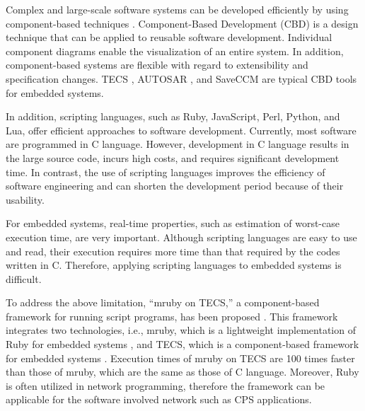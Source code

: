 \documentclass[conference]{IEEEtran/IEEEtran/IEEEtran}
\begin{document}
Complex and large-scale software systems can be developed efficiently by using component-based techniques \cite{par:Crnkovic}.
Component-Based Development (CBD) is a design technique that can be applied to reusable software development.
Individual component diagrams enable the visualization of an entire system.
In addition, component-based systems are flexible with regard to extensibility and specification changes.
TECS \cite{par:TECS}, AUTOSAR \cite{url:AUTOSAR}, and SaveCCM \cite{par:SAVEapproach} are typical CBD tools for embedded systems.

In addition, scripting languages, such as Ruby, JavaScript, Perl, Python, and Lua, offer efficient approaches to software development.
Currently, most software are programmed in C language.
However, development in C language results in the large source code, incurs high costs, and requires significant development time.
In contrast, the use of scripting languages improves the efficiency of software engineering and can shorten the development period because of their usability. 

For embedded systems, real-time properties, such as estimation of worst-case execution time, are very important.
Although scripting languages are easy to use and read, their execution requires more time than that required by the codes written in C.
Therefore, applying scripting languages to embedded systems is difficult.

To address the above limitation, ``mruby on TECS,'' a component-based framework for running script programs, has been proposed \cite{par:mrubyonTECS}.
This framework integrates two technologies, i.e., mruby, which is a lightweight implementation of Ruby for embedded systems \cite{par:mruby}, and TECS, which is a component-based framework for embedded systems \cite{par:TECS}.
Execution times of mruby on TECS are 100 times faster than those of mruby, which are the same as those of C language.
Moreover, Ruby is often utilized in network programming, therefore the framework can be applicable for the software involved network such as CPS applications.
\end{document}
